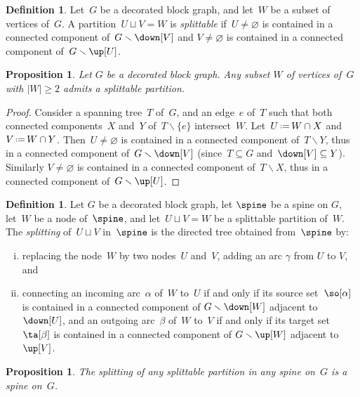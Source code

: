 \documentclass{amsart}
\newtheorem{proposition}[theorem]{Proposition}
\theoremstyle{definition}
\newtheorem{definition}[theorem]{Definition}
\newcommand{\ssm}{\smallsetminus} %
\newcommand{\eqdef}{\mbox{\,\raisebox{0.2ex}{\scriptsize\ensuremath{\mathrm:}}\ensuremath{=}\,}} %
\newcommand{\darkblue}{\color{darkblue}} %
\newcommand{\defn}[1]{\textsl{\darkblue #1}} %
\begin{document}
\begin{definition}
  \label{def:splittable}
  Let~$G$ be a decorated block graph, and let~$W$ be a subset of vertices of~$G$.
  A partition~$U \sqcup V = W$ is \defn{splittable} if~$U \ne \varnothing$ is contained in a connected component of~$G \ssm \down[V]$ and $V \ne \varnothing$ is contained in a connected component of~$G \ssm \up[U]$.
\end{definition}

\begin{proposition}
  \label{prop:splittablePartitions}
  Let $G$ be a decorated block graph. Any subset $W$ of vertices of~$G$ with $|W| \ge 2$ admits a splittable partition.
\end{proposition}

\begin{proof} 
  Consider a spanning tree~$T$ of~$G$, and an edge~$e$ of~$T$ such that both connected components~$X$ and~$Y$ of~$T \ssm \{e\}$ intersect~$W$.
  Let~$U \eqdef W \cap X$ and~$V \eqdef W \cap Y$.
  Then~$U \ne \varnothing$ is contained in a connected component of~$T \ssm Y$, thus in a connected component of~$G \ssm \down[V]$ (since~$T \subseteq G$ and~$\down[V] \subseteq Y$).
  Similarly $V \ne \varnothing$ is contained in a connected component of~$T \ssm X$, thus in a connected component of~$G \ssm \up[U]$.
\end{proof}

\begin{definition}
  \label{def:vertexsplitting} 
  Let $G$ be a decorated block graph, let $\spine$ be a spine on $G$, let~$W$ be a node of~$\spine$, and let~$U \sqcup V = W$ be a splittable partition of~$W$.
  The \defn{splitting} of~$U \sqcup V$ in~$\spine$ is the directed tree obtained from~$\spine$ by:
  \begin{enumerate}[(i)]
    \item replacing the node~$W$ by two nodes~$U$ and~$V$, adding an arc $\gamma$ from $U$ to $V$, and 
    \item connecting an incoming arc~$\alpha$ of~$W$ to~$U$ if and only if its source set~$\so[\alpha]$ is contained in a connected component of $G \ssm \down[W]$ adjacent to $\down[U]$, and an outgoing arc~$\beta$ of~$W$ to~$V$ if and only if its target set~$\ta[\beta]$ is contained in a connected component of $G \ssm \up[W]$ adjacent to $\up[V]$.
  \end{enumerate}
\end{definition}

\begin{proposition}
  \label{prop:vertexsplitting} 
  The splitting of any splittable partition in any spine on~$G$ is a spine on~$G$.
\end{proposition}
\end{document}
